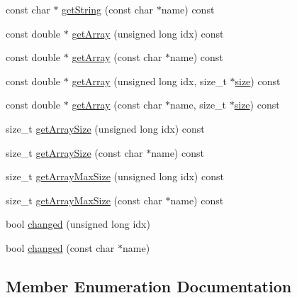 \begin{DoxyCompactItemize}
\item 
const char $\ast$ \hyperlink{class_frame_lib___parameters_acee2bbf4822572b7b37447462f50c44b}{get\+String} (const char $\ast$name) const
\item 
const double $\ast$ \hyperlink{class_frame_lib___parameters_adc277fde0bbaa9250076b58efc9428e6}{get\+Array} (unsigned long idx) const
\item 
const double $\ast$ \hyperlink{class_frame_lib___parameters_a4a5ff203e9384ca2fb73b7589a6de74e}{get\+Array} (const char $\ast$name) const
\item 
const double $\ast$ \hyperlink{class_frame_lib___parameters_a645085b04512fadc95ff59b910954bdc}{get\+Array} (unsigned long idx, size\+\_\+t $\ast$\hyperlink{class_frame_lib___parameters_a391d0cb37c904981f7ad52bc0ba1b111}{size}) const
\item 
const double $\ast$ \hyperlink{class_frame_lib___parameters_a09126c9d1be171bde88fe171944bc038}{get\+Array} (const char $\ast$name, size\+\_\+t $\ast$\hyperlink{class_frame_lib___parameters_a391d0cb37c904981f7ad52bc0ba1b111}{size}) const
\item 
size\+\_\+t \hyperlink{class_frame_lib___parameters_a393371aad3079281d84150f9343b8e88}{get\+Array\+Size} (unsigned long idx) const
\item 
size\+\_\+t \hyperlink{class_frame_lib___parameters_a6aab87bc340522a457d3275728d6ad69}{get\+Array\+Size} (const char $\ast$name) const
\item 
size\+\_\+t \hyperlink{class_frame_lib___parameters_ac65d6b2f5cee3b3c95b321c67de6fadb}{get\+Array\+Max\+Size} (unsigned long idx) const
\item 
size\+\_\+t \hyperlink{class_frame_lib___parameters_aa471582edb55bbb44146a560228821ef}{get\+Array\+Max\+Size} (const char $\ast$name) const
\item 
bool \hyperlink{class_frame_lib___parameters_a1ddc66de3c5b22c98c61692139d6edb1}{changed} (unsigned long idx)
\item 
bool \hyperlink{class_frame_lib___parameters_a6bd6af480a8d8f589ee7443c690f75b0}{changed} (const char $\ast$name)
\end{DoxyCompactItemize}


\subsection{Member Enumeration Documentation}
\mbox{\label{class_frame_lib___parameters_afcefd8a6a664599b93f635538d95265a}} 

